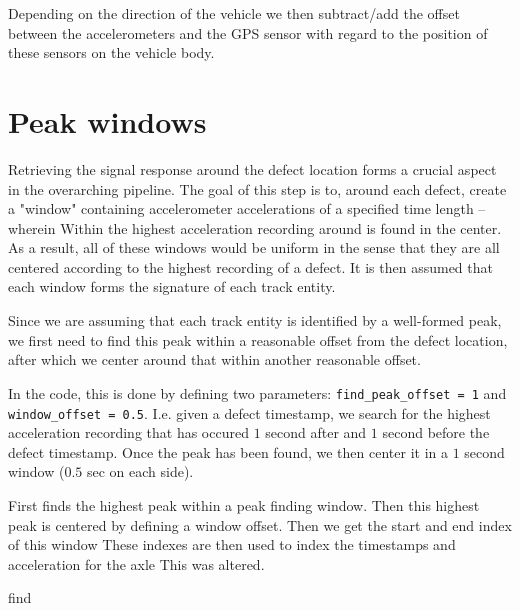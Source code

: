 Depending on the direction of the vehicle we then subtract/add the offset between the accelerometers and the GPS sensor with regard to the position of these sensors on the vehicle body.


\section{Peak windows}
Retrieving the signal response around the defect location forms a crucial aspect in the overarching pipeline. The goal of this step is to, around each defect, create a "window" containing accelerometer accelerations of a specified time length -- wherein Within the highest acceleration recording around is found in the center. As a result, all of these windows would be uniform in the sense that they are all centered according to the highest recording of a defect. It is then assumed that each window forms the signature of each track entity. 

Since we are assuming that each track entity is identified by a well-formed peak, we first need to find this peak within a reasonable offset from the defect location, after which we center around that within another reasonable offset. 

In the code, this is done by defining two parameters: \verb|find_peak_offset = 1| and \verb|window_offset = 0.5|. I.e. given a defect timestamp, we search for the highest acceleration recording that has occured $1$ second after and $1$ second before the defect timestamp. Once the peak has been found, we then center it in a $1$ second window ($0.5$ sec on each side).










First finds the highest peak within a peak finding window.
    Then this highest peak is centered by defining a window offset.
    Then we get the start and end index of this window
    These indexes are then used to index the timestamps and acceleration for the axle
This was altered.

find



